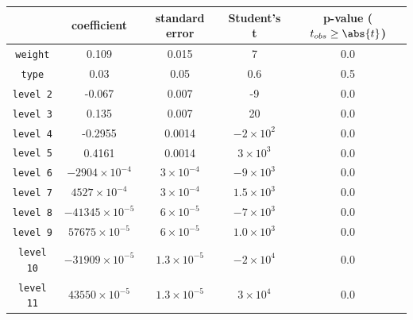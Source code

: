 \begin{table}[htbp]
  \centering
  \begin{tabular}{@{}ccccc@{}}
  \toprule
                     & \textbf{coefficient}        & \textbf{standard error} & \textbf{Student's t} & \textbf{p-value} ($t_{obs} \ge \abs{t}$)  \\
  \midrule
  \texttt{weight}    & 0.109                       & 0.015                   & 7                    & 0.0                                       \\
  \texttt{type}      & 0.03                        & 0.05                    & 0.6                  & 0.5                                       \\
  \texttt{level 2}   & -0.067                      & 0.007                   & -9                   & 0.0                                       \\
  \texttt{level 3}   & 0.135                       & 0.007                   & 20                   & 0.0                                       \\
  \texttt{level 4}   & -0.2955                     & 0.0014                  & $-2 \times 10^2$     & 0.0                                       \\
  \texttt{level 5}   & 0.4161                      & 0.0014                  & $3 \times 10^3$      & 0.0                                       \\
  \texttt{level 6}   & $-2904 \times 10^{-4}$      & $3 \times 10^{-4}$      & $-9 \times 10^3$     & 0.0                                       \\
  \texttt{level 7}   & $4527 \times 10^{-4}$       & $3 \times 10^{-4}$      & $1.5 \times 10^3$    & 0.0                                       \\
  \texttt{level 8}   & $-41345 \times 10^{-5}$     & $6 \times 10^{-5}$      & $-7 \times 10^3$     & 0.0                                       \\
  \texttt{level 9}   & $57675 \times 10^{-5}$      & $6 \times 10^{-5}$      & $1.0 \times 10^3$    & 0.0                                       \\
  \texttt{level 10}  & $-31909 \times 10^{-5}$     & $1.3 \times 10^{-5}$    & $-2 \times 10^4$     & 0.0                                       \\
  \texttt{level 11}  & $43550 \times 10^{-5}$      & $1.3 \times 10^{-5}$    & $3 \times 10^4$      & 0.0                                       \\

\end{tabular}
\end{table}
